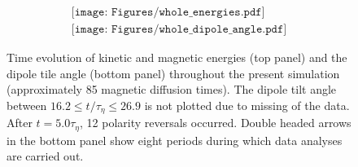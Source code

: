 \begin{figure}[ht]
\begin{center}
\[
\begin{array}{c}
\texttt{[image: Figures/whole\_energies.pdf]} \\
\texttt{[image: Figures/whole\_dipole\_angle.pdf]}
\end{array}
\]
\end{center}
\caption{
Time evolution of kinetic and magnetic energies (top panel) and the dipole tile angle (bottom panel) throughout the present simulation (approximately 85 magnetic diffusion times).
The dipole tilt angle between $16.2 \le t / \tau_{\eta} \le 26.9$ is not plotted due to missing of the data. 
After $t = 5.0 \tau_{\eta}$, 12 polarity reversals occurred.
Double headed arrows in the bottom panel show eight periods during which data analyses are carried out.
}
\label{fig:sph_shell_275_full}
\end{figure}